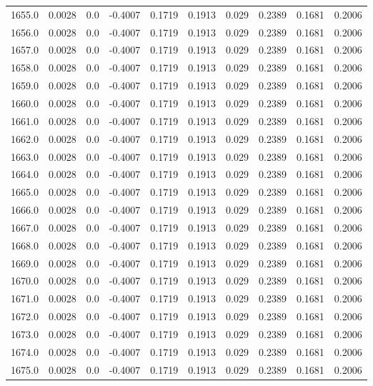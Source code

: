 \begin{longtable}{lrrrrrrrrr}
1655.0 & 0.0028 & 0.0 & -0.4007 & 0.1719 & 0.1913 & 0.029 & 0.2389 & 0.1681 & 0.2006 \\
1656.0 & 0.0028 & 0.0 & -0.4007 & 0.1719 & 0.1913 & 0.029 & 0.2389 & 0.1681 & 0.2006 \\
1657.0 & 0.0028 & 0.0 & -0.4007 & 0.1719 & 0.1913 & 0.029 & 0.2389 & 0.1681 & 0.2006 \\
1658.0 & 0.0028 & 0.0 & -0.4007 & 0.1719 & 0.1913 & 0.029 & 0.2389 & 0.1681 & 0.2006 \\
1659.0 & 0.0028 & 0.0 & -0.4007 & 0.1719 & 0.1913 & 0.029 & 0.2389 & 0.1681 & 0.2006 \\
1660.0 & 0.0028 & 0.0 & -0.4007 & 0.1719 & 0.1913 & 0.029 & 0.2389 & 0.1681 & 0.2006 \\
1661.0 & 0.0028 & 0.0 & -0.4007 & 0.1719 & 0.1913 & 0.029 & 0.2389 & 0.1681 & 0.2006 \\
1662.0 & 0.0028 & 0.0 & -0.4007 & 0.1719 & 0.1913 & 0.029 & 0.2389 & 0.1681 & 0.2006 \\
1663.0 & 0.0028 & 0.0 & -0.4007 & 0.1719 & 0.1913 & 0.029 & 0.2389 & 0.1681 & 0.2006 \\
1664.0 & 0.0028 & 0.0 & -0.4007 & 0.1719 & 0.1913 & 0.029 & 0.2389 & 0.1681 & 0.2006 \\
1665.0 & 0.0028 & 0.0 & -0.4007 & 0.1719 & 0.1913 & 0.029 & 0.2389 & 0.1681 & 0.2006 \\
1666.0 & 0.0028 & 0.0 & -0.4007 & 0.1719 & 0.1913 & 0.029 & 0.2389 & 0.1681 & 0.2006 \\
1667.0 & 0.0028 & 0.0 & -0.4007 & 0.1719 & 0.1913 & 0.029 & 0.2389 & 0.1681 & 0.2006 \\
1668.0 & 0.0028 & 0.0 & -0.4007 & 0.1719 & 0.1913 & 0.029 & 0.2389 & 0.1681 & 0.2006 \\
1669.0 & 0.0028 & 0.0 & -0.4007 & 0.1719 & 0.1913 & 0.029 & 0.2389 & 0.1681 & 0.2006 \\
1670.0 & 0.0028 & 0.0 & -0.4007 & 0.1719 & 0.1913 & 0.029 & 0.2389 & 0.1681 & 0.2006 \\
1671.0 & 0.0028 & 0.0 & -0.4007 & 0.1719 & 0.1913 & 0.029 & 0.2389 & 0.1681 & 0.2006 \\
1672.0 & 0.0028 & 0.0 & -0.4007 & 0.1719 & 0.1913 & 0.029 & 0.2389 & 0.1681 & 0.2006 \\
1673.0 & 0.0028 & 0.0 & -0.4007 & 0.1719 & 0.1913 & 0.029 & 0.2389 & 0.1681 & 0.2006 \\
1674.0 & 0.0028 & 0.0 & -0.4007 & 0.1719 & 0.1913 & 0.029 & 0.2389 & 0.1681 & 0.2006 \\
1675.0 & 0.0028 & 0.0 & -0.4007 & 0.1719 & 0.1913 & 0.029 & 0.2389 & 0.1681 & 0.2006 \\

\end{longtable}
